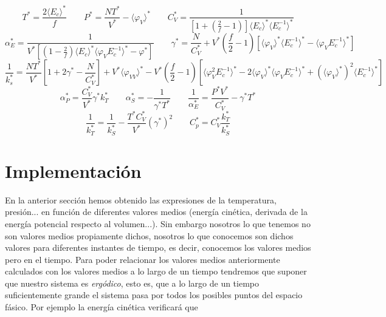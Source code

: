 \documentclass[11pt]{article} %
\newcommand{\parentesis}[1]{\left( #1  \right)}
\newcommand{\ccorchetes}[1]{\left[ #1  \right]}
\newcommand{\dquad}{\quad \quad}
\newcommand{\Ec}{\langle E_c \rangle}
\newcommand{\Ecinv}{\langle E_c^{-1} \rangle}
\newcommand{\varphiV}{\langle \varphi_V \rangle}
\newcommand{\varphiVV}{\langle \varphi_{VV}\rangle}
\newcommand{\varphiVEcinv}{\langle \varphi_V E_c^{-1} \rangle}
\newcommand{\varphiVVEcinv}{ \langle \varphi_V^2 E_c^{-1} \rangle}
\begin{document}
\begin{equation*}
	T^* = \frac{2\Ec^*}{f} \dquad P^* = \frac{NT^*}{V^*} - \langle \varphi_V \rangle^* \dquad C_V^* = \frac{1}{\ccorchetes{1+\parentesis{\frac{2}{f}-1}}\Ec^* \Ecinv^*}   
\end{equation*}
\begin{equation*}
	\alpha_E^*  = \frac{1}{V^*\ccorchetes{\parentesis{1-\frac{2}{f}}\Ec^* \varphiVEcinv^* - \varphi^* }} \dquad \gamma^*  = \frac{N}{C_V^*} + V^* \parentesis{\frac{f}{2} -1} \ccorchetes{\varphiV^* \Ecinv^* - \varphiVEcinv^*}  
\end{equation*}
\begin{equation*}
	\frac{1}{k_s^*} = \frac{NT^*}{V^*} \ccorchetes{1+2\gamma^* - \frac{N}{C_V^*}} + V^* \varphiVV^*  - V^*\parentesis{\frac{f}{2} -1} \ccorchetes{\varphiVVEcinv^* - 2 \varphiV^* \varphiVEcinv^* + (\varphiV^*)^2 \Ecinv^*}
\end{equation*}
\begin{equation*}
	\alpha_P^* = \frac{C_V^*}{V^*} \gamma^* k_T^* \dquad \alpha_S^* = - \frac{1}{\gamma^* T^*} \dquad \frac{1}{\alpha_E^*} = \frac{P^*V^*}{C_V^*} - \gamma^* T^* 
\end{equation*}
\begin{equation*}
	\frac{1}{k_T^*} = \frac{1}{k_S^*} - \frac{T^*C_V^*}{V^*} (\gamma^*)^2 \dquad C_p^* = C_V^* \frac{k_T^*}{k_S^*}
\end{equation*}

\section{Implementación} \label{Sec:04}

En la anterior sección hemos obtenido las expresiones de la temperatura, presión... en función de diferentes valores medios (energía cinética, derivada de la energía potencial respecto al volumen...). Sin embargo nosotros lo que tenemos no son valores medios propiamente dichos, nosotros lo que conocemos son dichos valores para diferentes instantes de tiempo, es decir, conocemos los valores medios pero en el tiempo. Para poder relacionar los valores medios anteriormente calculados con los valores medios a lo largo de un tiempo tendremos que suponer que nuestro sistema es \textit{ergódico}, esto es, que a lo largo de un tiempo suficientemente grande el sistema pasa por todos los posibles puntos del espacio fásico. Por ejemplo la energía cinética verificará que
\end{document}
